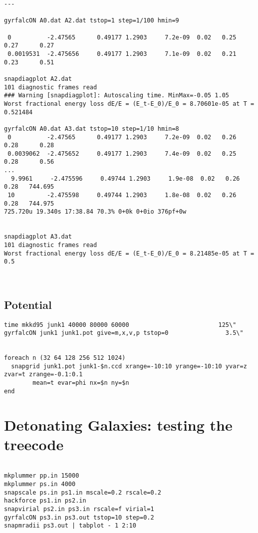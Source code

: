 \begin{itemize}
\begin{itemize}
\begin{verbatim}
---

gyrfalcON A0.dat A2.dat tstop=1 step=1/100 hmin=9

 0          -2.47565      0.49177 1.2903     7.2e-09  0.02   0.25       0.27      0.27
 0.0019531  -2.475656     0.49177 1.2903     7.1e-09  0.02   0.21       0.23      0.51

snapdiagplot A2.dat
101 diagnostic frames read
### Warning [snapdiagplot]: Autoscaling time. MinMax=-0.05 1.05
Worst fractional energy loss dE/E = (E_t-E_0)/E_0 = 8.70601e-05 at T = 0.521484

gyrfalcON A0.dat A3.dat tstop=10 step=1/10 hmin=8
 0          -2.47565      0.49177 1.2903     7.2e-09  0.02   0.26       0.28      0.28
 0.0039062  -2.475652     0.49177 1.2903     7.4e-09  0.02   0.25       0.28      0.56
...
  9.9961     -2.475596     0.49744 1.2903     1.9e-08  0.02   0.26       0.28   744.695
 10         -2.475598     0.49744 1.2903     1.8e-08  0.02   0.26       0.28   744.975
725.720u 19.340s 17:38.84 70.3% 0+0k 0+0io 376pf+0w


snapdiagplot A3.dat
101 diagnostic frames read
Worst fractional energy loss dE/E = (E_t-E_0)/E_0 = 8.21485e-05 at T = 0.5



\end{verbatim}\normalsize

\subsection{Potential}

\footnotesize\begin{verbatim}
time mkkd95 junk1 40000 80000 60000                         125\"
gyrfalcON junk1 junk1.pot give=m,x,v,p tstop=0                3.5\"


foreach n (32 64 128 256 512 1024)
  snapgrid junk1.pot junk1-$n.ccd xrange=-10:10 yrange=-10:10 yvar=z zvar=t zrange=-0.1:0.1 
        mean=t evar=phi nx=$n ny=$n
end

\end{verbatim}\normalsize  %

\section{Detonating Galaxies: testing the treecode}

\footnotesize\begin{verbatim}

mkplummer pp.in 15000
mkplummer ps.in 4000
snapscale ps.in ps1.in mscale=0.2 rscale=0.2
hackforce ps1.in ps2.in
snapvirial ps2.in ps3.in rscale=f virial=1
gyrfalcON ps3.in ps3.out tstop=10 step=0.2
snapmradii ps3.out | tabplot - 1 2:10


\end{verbatim}
\end{itemize}
\end{itemize}

